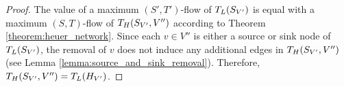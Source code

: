 \begin{proof}
The value of a maximum $(S',T')$-flow of $T_L(S_{V'})$ is equal with a maximum
$(S,T)$-flow of $T_H(S_{V'},V'')$ according to Theorem \ref{theorem:heuer_network}.
Since each $v \in V''$ is either a source or sink node of $T_L(S_{V'})$, the 
removal of $v$ does not induce any additional edges in $T_H(S_{V'},V'')$
(see Lemma \ref{lemma:source_and_sink_removal}). Therefore,
$T_H(S_{V'},V'') = T_L(H_{V'})$.
\end{proof}

